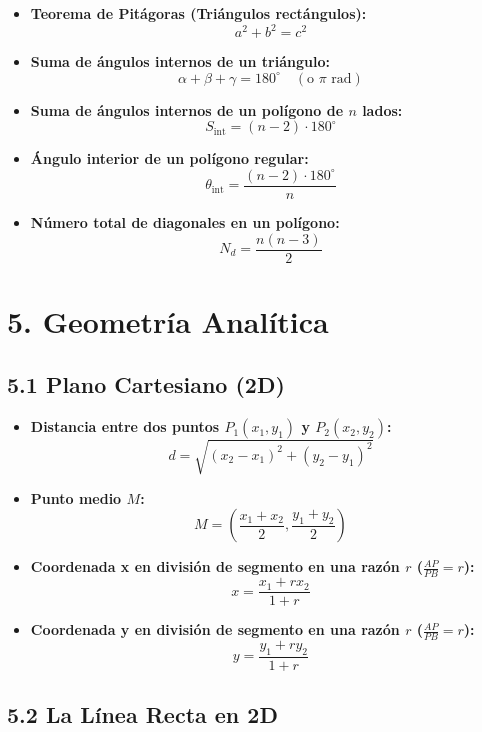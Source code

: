 \documentclass[11pt,a4paper]{article}
\begin{document}
\begin{itemize}
  \item \textbf{Teorema de Pitágoras (Triángulos rectángulos):}
  \[
    a^2 + b^2 = c^2
  \]
  \item \textbf{Suma de ángulos internos de un triángulo:}
  \[
    \alpha + \beta + \gamma = 180^\circ \quad (\text{o } \pi\text{ rad})
  \]
  \item \textbf{Suma de ángulos internos de un polígono de $n$ lados:}
  \[
    S_{\text{int}} = (n - 2) \cdot 180^\circ
  \]
  \item \textbf{Ángulo interior de un polígono regular:}
  \[
    \theta_{\text{int}} = \frac{(n - 2) \cdot 180^\circ}{n}
  \]
  \item \textbf{Número total de diagonales en un polígono:}
  \[
    N_d = \frac{n(n - 3)}{2}
  \]
\end{itemize}

\section*{5. Geometría Analítica}

\subsection*{5.1 Plano Cartesiano (2D)}

\begin{itemize}
  \item \textbf{Distancia entre dos puntos $P_1(x_1, y_1)$ y $P_2(x_2, y_2)$:}
  \[
    d = \sqrt{(x_2 - x_1)^2 + (y_2 - y_1)^2}
  \]
  \item \textbf{Punto medio $M$:}
  \[
    M = \left(\frac{x_1 + x_2}{2}, \frac{y_1 + y_2}{2}\right)
  \]
  \item \textbf{Coordenada x en división de segmento en una razón $r$ ($\frac{AP}{PB} = r$):}
  \[
    x = \frac{x_1 + r x_2}{1 + r}
  \]
  \item \textbf{Coordenada y en división de segmento en una razón $r$ ($\frac{AP}{PB} = r$):}
  \[
    y = \frac{y_1 + r y_2}{1 + r}
  \]
\end{itemize}

\subsection*{5.2 La Línea Recta en 2D}
\end{document}

